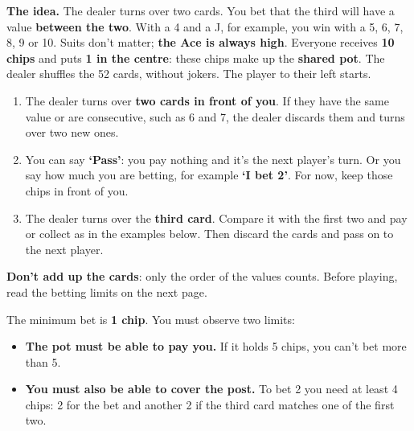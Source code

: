 \documentclass[10pt]{article}
\begin{document}
\startpage\label{acey}
\textbf{The idea.} The dealer turns over two cards. You bet that the third will have a value \textbf{between the two}. With a 4 and a J, for example, you win with a 5, 6, 7, 8, 9 or 10. Suits don’t matter; \textbf{the Ace is always high}.
Everyone receives \textbf{10 chips} and puts \textbf{1 in the centre}: these chips make up the \textbf{shared pot}. The dealer shuffles the 52 cards, without jokers. The player to their left starts.
\begin{enumerate}
 \item The dealer turns over \textbf{two cards in front of you}. If they have the same value or are consecutive, such as 6 and 7, the dealer discards them and turns over two new ones.
 \item You can say \textbf{‘Pass’}: you pay nothing and it’s the next player’s turn. Or you say how much you are betting, for example \textbf{‘I bet 2’}. For now, keep those chips in front of you.
 \item The dealer turns over the \textbf{third card}. Compare it with the first two and pay or collect as in the examples below. Then discard the cards and pass on to the next player.
\end{enumerate}
\begin{center}
\hfill
{}\hfill
{}
\par\vspace{1mm}{\footnotesize In the examples you bet 2. If you win, you keep your 2 chips too.}
\end{center}
\begin{callout}
\textbf{Don’t add up the cards}: only the order of the values counts. Before playing, read the betting limits on the next page.
\end{callout}
\startpage
{}
The minimum bet is \textbf{1 chip}. You must observe two limits:
\begin{itemize}
 \item \textbf{The pot must be able to pay you.} If it holds 5 chips, you can’t bet more than 5.
 \item \textbf{You must also be able to cover the post.} To bet 2 you need at least 4 chips: 2 for the bet and another 2 if the third card matches one of the first two.
\end{itemize}
\end{document}
